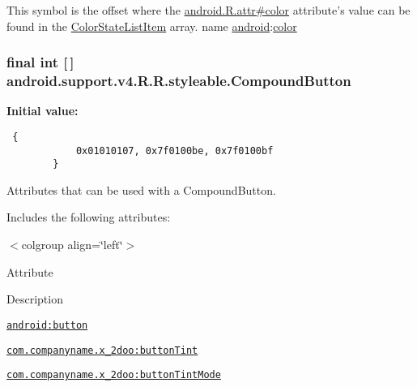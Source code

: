 This symbol is the offset where the \hyperlink{}{android.R.attr\#color} attribute's value can be found in the \hyperlink{classandroid_1_1support_1_1v4_1_1_r_1_1styleable_47476cf7ffe4d9c8245bd3670938eac6}{ColorStateListItem} array.  name \hyperlink{namespaceandroid}{android}:\hyperlink{classandroid_1_1support_1_1v4_1_1_r_1_1color}{color} \hypertarget{classandroid_1_1support_1_1v4_1_1_r_1_1styleable_0f66eed6935e1b8ebc6b74c5e0089183}{
\subsubsection[{CompoundButton}]{\setlength{\rightskip}{0pt plus 5cm}final int \mbox{[}$\,$\mbox{]} android.support.v4.R.R.styleable.CompoundButton}}
\label{classandroid_1_1support_1_1v4_1_1_r_1_1styleable_0f66eed6935e1b8ebc6b74c5e0089183}


\textbf{Initial value:}

\begin{Code}\begin{verbatim} {
            0x01010107, 0x7f0100be, 0x7f0100bf
        }
\end{verbatim}
\end{Code}
Attributes that can be used with a CompoundButton. 

Includes the following attributes: \begin{TabularC}{0}
\hline
\end{TabularC}
$<$colgroup align=\char`\"{}left\char`\"{}$>$ 

Attribute

Description 

{\tt \hyperlink{classandroid_1_1support_1_1v4_1_1_r_1_1styleable_af18b699c10e7dee1620c5afb1bcde5a}{android:button}}

{\tt \hyperlink{classandroid_1_1support_1_1v4_1_1_r_1_1styleable_cb33184620c870325a8b7e37e0b99eca}{com.companyname.x\_\-2doo:buttonTint}}

{\tt \hyperlink{classandroid_1_1support_1_1v4_1_1_r_1_1styleable_47f68c1e5646a0561d3c3e5ba109c9f3}{com.companyname.x\_\-2doo:buttonTintMode}}

